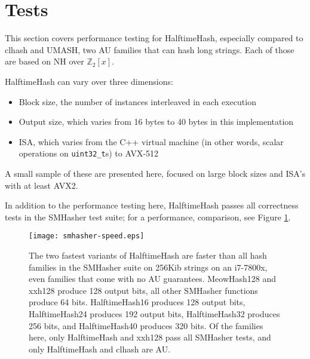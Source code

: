 \documentclass[runningheads]{llncs}
\newcommand{\ints}{\mathbb{Z}}
\begin{document}


\section{Tests}

This section covers performance testing for HalftimeHash, especially compared to clhash and UMASH, two AU families that can hash long strings.
Each of those are based on NH over $\ints_2[x]$.

HalftimeHash can vary over three dimensions:

\begin{itemize}
\item Block size, the number of instances interleaved in each execution
\item Output size, which varies from 16 bytes to 40 bytes in this implementation
\item ISA, which varies from the C++ virtual machine (in other words, scalar operations on \texttt{uint32\_t}s) to AVX-512
\end{itemize}

A small sample of these are presented here, focused on large block sizes and ISA's with at least AVX2.

In addition to the performance testing here, HalftimeHash passes all correctness tests in the SMHasher test suite; for a performance, comparison, see Figure \ref{smhasher-speed}.\cite{smhasher}

\begin{figure}
  \texttt{[image: smhasher-speed.eps]}
\caption{
  \label{smhasher-speed}
    The two fastest variants of HalftimeHash are faster than all hash families in the SMHasher suite on 256Kib strings on an i7-7800x, even families that come with no AU guarantees. \protect\cite{smhasher}
    MeowHash128 and xxh128 produce 128 output bits, all other SMHasher functions produce 64 bits.
    HalftimeHash16 produces 128 output bits, HalftimeHash24 produces 192 output bits, HalftimeHash32 produces 256 bits, and HalftimeHash40 produces 320 bits.
    Of the families here, only HalftimeHash and xxh128 pass all SMHasher tests, and only HalftimeHash and clhash are AU.
}
\end{figure}
\end{document}
